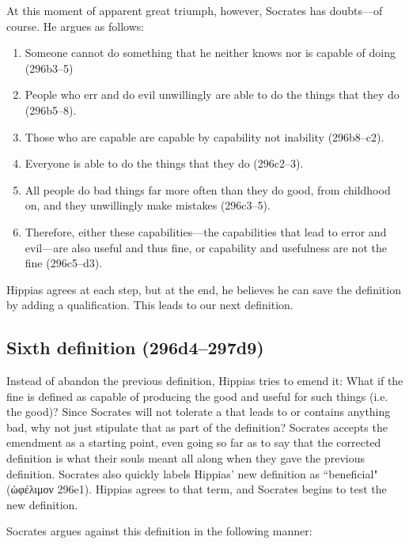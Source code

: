 \documentclass[12pt]{article}
\begin{document}
At this moment of apparent great triumph, however, Socrates has doubts---of course.  He argues as follows:

\begin{enumerate}
    \item Someone cannot do something that he neither knows nor is capable of doing (296b3--5)
    \item People who err and do evil unwillingly are able to do the things that they do (296b5--8).
    \item Those who are capable are capable by capability not inability (296b8--c2).
    \item Everyone is able to do the things that they do (296c2--3).
    \item All people do bad things far more often than they do good, from childhood on, and they unwillingly make mistakes (296c3--5).
    \item Therefore, either these capabilities---the capabilities that lead to error and evil---are also useful and thus fine, or capability and usefulness are not the fine (296c5--d3).
\end{enumerate}

Hippias agrees at each step, but at the end, he believes he can save the definition by adding a qualification.  This leads to our next definition.


\subsection{Sixth definition (296d4--297d9)}

Instead of abandon the previous definition, Hippias tries to emend it: What if the fine is defined as capable of producing the good and useful for such things (i.e. the good)?  Since Socrates will not tolerate a  that leads to or contains anything bad, why not just stipulate that as part of the definition?  Socrates accepts the emendment as a starting point, even going so far as to say that the corrected definition is what their souls meant all along when they gave the previous definition.  Socrates also quickly labels Hippias' new definition as ``beneficial" ({\g ὠφέλιμον} 296e1).  Hippias agrees to that term, and Socrates begins to test the new definition.

Socrates argues against this definition in the following manner:
\end{document}
